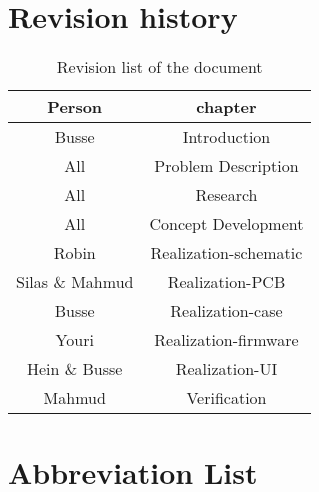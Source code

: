 \begin{justify}


\newpage
\tableofcontents
\thispagestyle{empty}

\listoffigures
\thispagestyle{empty}


\listoftables
\thispagestyle{empty}

\newpage
\pagestyle{plain}

\chapter*{Revision history}
\begin{table}[!h]
	\centering
\begin{tabular}{|c|c|}
		\hline
\textbf{Person} & \textbf{chapter} \\ \hline
Busse				& Introduction \\ \hline
All					& Problem Description \\ \hline
All					& Research \\ \hline
All					& Concept Development \\ \hline
Robin				& Realization-schematic \\ \hline
Silas \& Mahmud		& Realization-PCB \\ \hline
Busse				& Realization-case \\ \hline
Youri				& Realization-firmware \\ \hline
Hein \& Busse		& Realization-UI \\ \hline
Mahmud				& Verification \\ \hline

\end{tabular}
\caption{Revision list of the document}
\label{Revision history}
\end{table}

\newpage
\pagestyle{plain}
\setcounter{page}{1}

\chapter*{Abbreviation List}


\end{justify}
